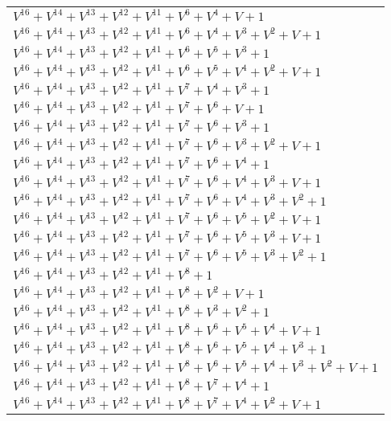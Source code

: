 \documentclass[12pt]{article}
\begin{document}
\begin{adjustwidth}{-4cm}{}
\begin{center}
\begin{longtable}{|l|}
$V^{16}  +V^{14}  +V^{13}  +V^{12}  +V^{11}  +V^{6}  +V^{4}  + V + 1$ \\
$V^{16}  +V^{14}  +V^{13}  +V^{12}  +V^{11}  +V^{6}  +V^{4}  +V^{3}  +V^{2}  + V + 1$ \\
$V^{16}  +V^{14}  +V^{13}  +V^{12}  +V^{11}  +V^{6}  +V^{5}  +V^{3}  + 1$ \\
$V^{16}  +V^{14}  +V^{13}  +V^{12}  +V^{11}  +V^{6}  +V^{5}  +V^{4}  +V^{2}  + V + 1$ \\
$V^{16}  +V^{14}  +V^{13}  +V^{12}  +V^{11}  +V^{7}  +V^{4}  +V^{3}  + 1$ \\
$V^{16}  +V^{14}  +V^{13}  +V^{12}  +V^{11}  +V^{7}  +V^{6}  + V + 1$ \\
$V^{16}  +V^{14}  +V^{13}  +V^{12}  +V^{11}  +V^{7}  +V^{6}  +V^{3}  + 1$ \\
$V^{16}  +V^{14}  +V^{13}  +V^{12}  +V^{11}  +V^{7}  +V^{6}  +V^{3}  +V^{2}  + V + 1$ \\
$V^{16}  +V^{14}  +V^{13}  +V^{12}  +V^{11}  +V^{7}  +V^{6}  +V^{4}  + 1$ \\
$V^{16}  +V^{14}  +V^{13}  +V^{12}  +V^{11}  +V^{7}  +V^{6}  +V^{4}  +V^{3}  + V + 1$ \\
$V^{16}  +V^{14}  +V^{13}  +V^{12}  +V^{11}  +V^{7}  +V^{6}  +V^{4}  +V^{3}  +V^{2}  + 1$ \\
$V^{16}  +V^{14}  +V^{13}  +V^{12}  +V^{11}  +V^{7}  +V^{6}  +V^{5}  +V^{2}  + V + 1$ \\
$V^{16}  +V^{14}  +V^{13}  +V^{12}  +V^{11}  +V^{7}  +V^{6}  +V^{5}  +V^{3}  + V + 1$ \\
$V^{16}  +V^{14}  +V^{13}  +V^{12}  +V^{11}  +V^{7}  +V^{6}  +V^{5}  +V^{3}  +V^{2}  + 1$ \\
$V^{16}  +V^{14}  +V^{13}  +V^{12}  +V^{11}  +V^{8}  + 1$ \\
$V^{16}  +V^{14}  +V^{13}  +V^{12}  +V^{11}  +V^{8}  +V^{2}  + V + 1$ \\
$V^{16}  +V^{14}  +V^{13}  +V^{12}  +V^{11}  +V^{8}  +V^{3}  +V^{2}  + 1$ \\
$V^{16}  +V^{14}  +V^{13}  +V^{12}  +V^{11}  +V^{8}  +V^{6}  +V^{5}  +V^{4}  + V + 1$ \\
$V^{16}  +V^{14}  +V^{13}  +V^{12}  +V^{11}  +V^{8}  +V^{6}  +V^{5}  +V^{4}  +V^{3}  + 1$ \\
$V^{16}  +V^{14}  +V^{13}  +V^{12}  +V^{11}  +V^{8}  +V^{6}  +V^{5}  +V^{4}  +V^{3}  +V^{2}  + V + 1$ \\
$V^{16}  +V^{14}  +V^{13}  +V^{12}  +V^{11}  +V^{8}  +V^{7}  +V^{4}  + 1$ \\
$V^{16}  +V^{14}  +V^{13}  +V^{12}  +V^{11}  +V^{8}  +V^{7}  +V^{4}  +V^{2}  + V + 1$ \\

\end{longtable}
\end{center}
\end{adjustwidth}
\end{document}
